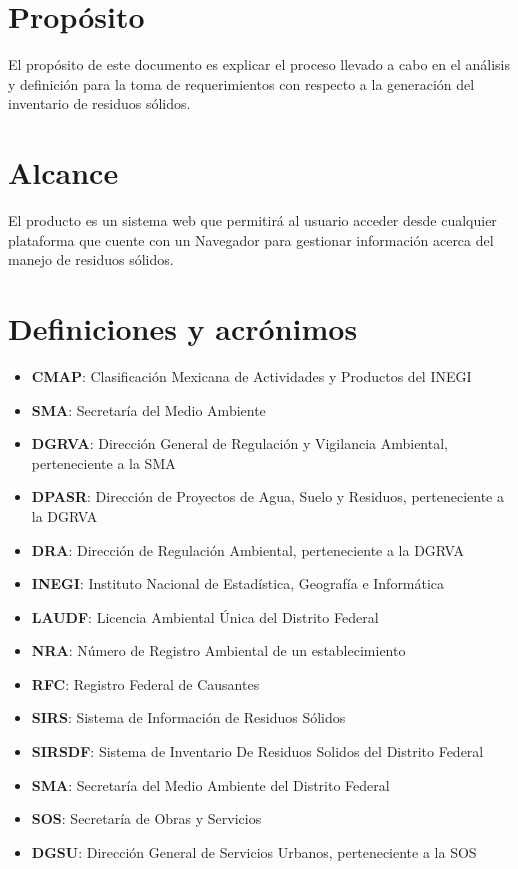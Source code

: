 \section{Propósito}

El propósito de este documento es explicar el proceso llevado a cabo en el análisis y definición para la toma de requerimientos con respecto a la generación del inventario de residuos sólidos.

\section{Alcance}
El producto es un sistema web que permitirá al usuario acceder desde cualquier plataforma que cuente con un Navegador para gestionar información acerca del manejo de residuos sólidos.


\section{Definiciones y acrónimos}
\begin{itemize}
	\item \textbf{CMAP}: Clasificación Mexicana de Actividades  y Productos del INEGI
	\item \textbf{SMA}: Secretaría del Medio Ambiente
	\item \textbf{DGRVA}: Dirección General de Regulación y Vigilancia Ambiental, perteneciente a la SMA
	\item \textbf{DPASR}: Dirección de Proyectos de Agua, Suelo y Residuos, perteneciente a la DGRVA
	\item \textbf{DRA}: Dirección de Regulación Ambiental, perteneciente a la DGRVA
	\item \textbf{INEGI}: Instituto Nacional de Estadística, Geografía e Informática
	\item \textbf{LAUDF}: Licencia Ambiental Única del Distrito Federal
	\item \textbf{NRA}: Número de Registro Ambiental de un establecimiento
	\item \textbf{RFC}: Registro Federal de Causantes
	\item \textbf{SIRS}: Sistema de Información de Residuos Sólidos
	\item \textbf{SIRSDF}: Sistema de Inventario De Residuos Solidos del Distrito Federal
	\item \textbf{SMA}: Secretaría del Medio Ambiente del Distrito Federal
	\item \textbf{SOS}: Secretaría de Obras y Servicios
	\item \textbf{DGSU}: Dirección General de Servicios Urbanos, perteneciente a la SOS
\end{itemize}

